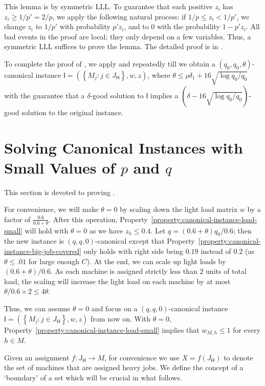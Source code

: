 \documentclass[11pt]{article}
\newcounter{prop}
\newcommand{\set}[1]{\left\{#1\right\}}
\newcommand{\cI}{{\mathsf I}}
\newcommand{\sfH}{{\mathsf H}}
\begin{document}
This lemma is by symmetric LLL. To guarantee that each positive $z_i$ has $z_i \geq 1/p' = 2/p$, we apply the following natural process: if $1/p \leq z_i < 1/p'$, we change $z_i$ to $1/p'$ with probability $p'z_i$, and to $0$ with the probability $1-p'z_i$. All bad events in the proof are local; they only depend on a few variables.  Thus, a symmetric LLL suffices to prove the lemma. The detailed proof is in .

To complete the proof of , we apply  and  repeatedly till we obtain a $(q_0, q_0, \theta)$-canonical instance $\cI = (\set{M_j : j \in J_\sfH}, w, z)$, where $\theta \leq \rho\delta_1 + 16\sqrt{\log q_0/q_0}$
with the guarantee that a $\delta$-good solution to $\cI$ implies a $(\delta - 16\sqrt{\log q_0/q_0})$-good solution to the original instance. 

\section{Solving Canonical Instances with Small Values of \texorpdfstring{$p$}{p} and \texorpdfstring{$q$}{q}}
\label{sec:fixq}

This section is devoted to proving .
\smallpq*

\noindent For convenience, we will make $\theta = 0$ by scaling down the light load matrix $w$ by a factor of $\frac{0.6}{0.6+\theta}$. After this operation, Property~\ref{property:canonical-instance-load-small} will hold with $\theta = 0$ as we have $z_h \leq 0.4$. Let $q = (0.6+\theta)q_0/0.6$; then the new instance is $(q, q, 0)$-canonical except that Property~\ref{property:canonical-instance-big-job-covered} only holds with right side being $0.19$ instead of $0.2$ (as $\theta \leq .01$ for large enough $C$).  At the end, we can scale up light loads by $(0.6+\theta)/0.6$. As each machine is assigned strictly less than  $2$  units of total load, the scaling will increase the light load on each machine by at most $\theta/0.6 \times 2 \leq 4\theta$.  

Thus, we can assume $\theta = 0$  and focus on a $(q, q, 0)$-canonical instance $\cI = (\set{M_j : j \in J_\sfH}, w, z)$ from now on.  With $\theta = 0$, Property~\ref{property:canonical-instance-load-small} implies that $w_{M,h} \leq 1$ for every $h \in M$.

 Given an assignment $f:J_\sfH \to M$, for convenience we use $X = f(J_\sfH)$ to denote the set of machines that are assigned heavy jobs. We define the concept of a `boundary' of a set which will be crucial in what follows.
\end{document}
